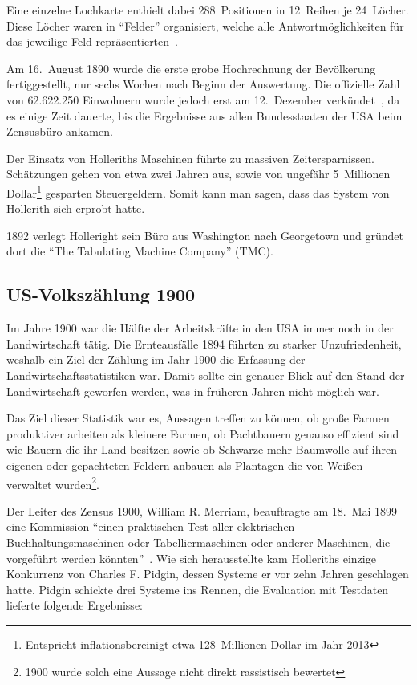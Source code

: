 \documentclass[parskip=half]{scrartcl}
\begin{document}
Eine einzelne Lochkarte enthielt dabei 288~Positionen in 12~Reihen je
24~Löcher. Diese Löcher waren in \enquote{Felder} organisiert, welche alle
Antwortmöglichkeiten für das jeweilige Feld
repräsentierten~\cite{priestley2010science}.

Am 16.~August 1890 wurde die erste grobe Hochrechnung der Bevölkerung
fertiggestellt, nur sechs Wochen nach Beginn der Auswertung. Die offizielle
Zahl von 62.622.250 Einwohnern wurde jedoch erst am 12.~Dezember
verkündet~\cite{austrian1982herman}, da es einige Zeit dauerte, bis die
Ergebnisse aus allen Bundesstaaten der USA beim Zensusbüro ankamen.

Der Einsatz von Holleriths Maschinen führte zu massiven Zeitersparnissen.
Schätzungen gehen von etwa zwei Jahren aus, sowie von ungefähr 5~Millionen
Dollar\footnote{Entspricht inflationsbereinigt etwa 128~Millionen Dollar im
Jahr 2013} gesparten Steuergeldern. Somit kann man sagen, dass das System von
Hollerith sich erprobt hatte.

1892 verlegt Holleright sein Büro aus Washington nach Georgetown und gründet
dort die \enquote{The Tabulating Machine Company} (TMC).

\subsection{US-Volkszählung 1900}
\label{sec:1900}

Im Jahre 1900 war die Hälfte der Arbeitskräfte in den USA immer noch in der
Landwirtschaft tätig. Die Ernteausfälle 1894 führten zu starker
Unzufriedenheit, weshalb ein Ziel der Zählung im Jahr 1900 die Erfassung der
Landwirtschaftsstatistiken war. Damit sollte ein genauer Blick auf den Stand der
Landwirtschaft geworfen werden, was in früheren Jahren nicht möglich war.

Das Ziel dieser Statistik war es, Aussagen treffen zu können, ob große Farmen
produktiver arbeiten als kleinere Farmen, ob Pachtbauern genauso effizient sind wie
Bauern die ihr Land besitzen sowie ob Schwarze mehr Baumwolle auf ihren eigenen
oder gepachteten Feldern anbauen als Plantagen die von Weißen verwaltet
wurden\footnote{1900 wurde solch eine Aussage nicht direkt rassistisch
bewertet}.

Der Leiter des Zensus 1900, William R. Merriam, beauftragte am 18.~Mai 1899
eine Kommission \enquote{einen praktischen Test aller elektrischen
Buchhaltungsmaschinen oder Tabelliermaschinen oder anderer Maschinen, die
vorgeführt werden könnten}~\cite{austrian1982herman}. Wie sich herausstellte
kam Holleriths einzige Konkurrenz von Charles F. Pidgin, dessen Systeme er vor
zehn Jahren geschlagen hatte. Pidgin schickte drei Systeme ins Rennen, die
Evaluation mit Testdaten lieferte folgende Ergebnisse:
\end{document}
